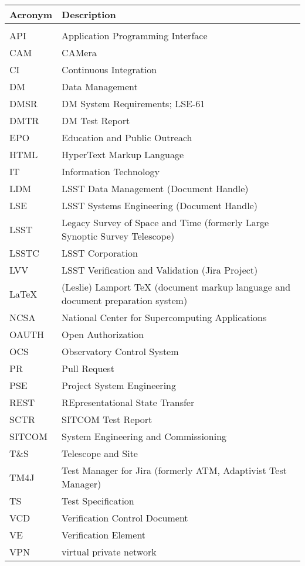 \documentclass[DM]{lsstdoc}
\begin{document}
\begin{tabular}{p{}p{}}\hline
\textbf{Acronym} & \textbf{Description}  \\\hline

 &  \\\hline
API & Application Programming Interface \\\hline
CAM & CAMera \\\hline
CI & Continuous Integration \\\hline
DM & Data Management \\\hline
DMSR & DM System Requirements; LSE-61 \\\hline
DMTR & DM Test Report \\\hline
EPO & Education and Public Outreach \\\hline
HTML & HyperText Markup Language \\\hline
IT & Information Technology \\\hline
LDM & LSST Data Management (Document Handle) \\\hline
LSE & LSST Systems Engineering (Document Handle) \\\hline
LSST & Legacy Survey of Space and Time (formerly Large Synoptic Survey Telescope) \\\hline
LSSTC & LSST Corporation \\\hline
LVV & LSST Verification and Validation (Jira Project) \\\hline
LaTeX & (Leslie) Lamport TeX (document markup language and document preparation system) \\\hline
NCSA & National Center for Supercomputing Applications \\\hline
OAUTH & Open Authorization \\\hline
OCS & Observatory Control System \\\hline
PR & Pull Request \\\hline
PSE & Project System Engineering \\\hline
REST & REpresentational State Transfer \\\hline
SCTR & SITCOM Test Report \\\hline
SITCOM & System Engineering and Commissioning \\\hline
T\&S & Telescope and Site \\\hline
TM4J & Test Manager for Jira (formerly ATM, Adaptivist Test Manager) \\\hline
TS & Test Specification \\\hline
VCD & Verification Control Document \\\hline
VE & Verification Element \\\hline
VPN & virtual private network \\\hline
\end{tabular}
\end{document}
